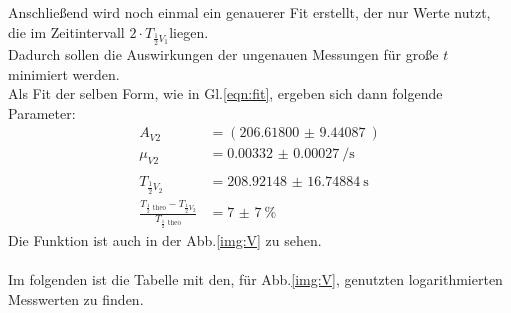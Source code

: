 \newline
\noindent
Anschließend wird noch einmal ein genauerer Fit erstellt, der nur Werte nutzt, die im Zeitintervall $2\cdot T_{\frac{1}{2}V_1}$liegen.\\
Dadurch sollen die Auswirkungen der ungenauen Messungen für große $t$ minimiert werden.\\
Als Fit der selben Form, wie in Gl.\ref{eqn:fit}, ergeben sich dann folgende Parameter:
\begin{align*}
    A_{V2}&=(\SI{206.61800(944087)}{})\\
    \mu_{V2}&=\SI{0.00332(27)}{\per\second}\\\\
    T_{\frac{1}{2}V_2}&= \SI{208.92148(1674884)}{\second}\\
    \frac{T_{\frac{1}{2}\text{ theo}}-T_{\frac{1}{2}V_2}}{T_{\frac{1}{2}\text{ theo}}}&=\SI{7(7)}{\percent}
\end{align*}
Die Funktion ist auch in der Abb.\ref{img:V} zu sehen.\\\\
\noindent
Im folgenden ist die Tabelle mit den, für Abb.\ref{img:V}, genutzten logarithmierten Messwerten zu finden. 
\newpage
